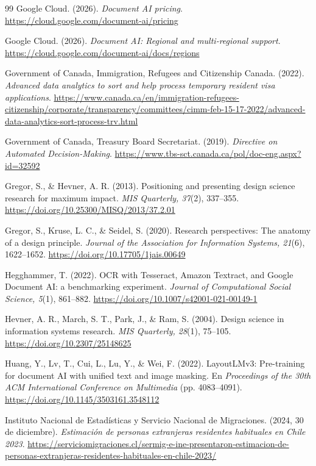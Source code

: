 \documentclass[11pt,a4paper]{article}
\begin{document}
\begin{thebibliography}{99}
Google Cloud. (2026). \emph{Document AI pricing}. \url{https://cloud.google.com/document-ai/pricing}

Google Cloud. (2026). \emph{Document AI: Regional and multi-regional support}. \url{https://cloud.google.com/document-ai/docs/regions}

Government of Canada, Immigration, Refugees and Citizenship Canada. (2022). \emph{Advanced data analytics to sort and help process temporary resident visa applications}. \url{https://www.canada.ca/en/immigration-refugees-citizenship/corporate/transparency/committees/cimm-feb-15-17-2022/advanced-data-analytics-sort-process-trv.html}

Government of Canada, Treasury Board Secretariat. (2019). \emph{Directive on Automated Decision-Making}. \url{https://www.tbs-sct.canada.ca/pol/doc-eng.aspx?id=32592}

Gregor, S., \& Hevner, A. R. (2013). Positioning and presenting design science research for maximum impact. \emph{MIS Quarterly, 37}(2), 337--355. \url{https://doi.org/10.25300/MISQ/2013/37.2.01}

Gregor, S., Kruse, L. C., \& Seidel, S. (2020). Research perspectives: The anatomy of a design principle. \emph{Journal of the Association for Information Systems, 21}(6), 1622--1652. \url{https://doi.org/10.17705/1jais.00649}

Hegghammer, T. (2022). OCR with Tesseract, Amazon Textract, and Google Document AI: a benchmarking experiment. \emph{Journal of Computational Social Science, 5}(1), 861--882. \url{https://doi.org/10.1007/s42001-021-00149-1}

Hevner, A. R., March, S. T., Park, J., \& Ram, S. (2004). Design science in information systems research. \emph{MIS Quarterly, 28}(1), 75--105. \url{https://doi.org/10.2307/25148625}

Huang, Y., Lv, T., Cui, L., Lu, Y., \& Wei, F. (2022). LayoutLMv3: Pre-training for document AI with unified text and image masking. En \emph{Proceedings of the 30th ACM International Conference on Multimedia} (pp. 4083--4091). \url{https://doi.org/10.1145/3503161.3548112}

Instituto Nacional de Estadísticas y Servicio Nacional de Migraciones. (2024, 30 de diciembre). \emph{Estimación de personas extranjeras residentes habituales en Chile 2023}. \url{https://serviciomigraciones.cl/sermig-e-ine-presentaron-estimacion-de-personas-extranjeras-residentes-habituales-en-chile-2023/}


\end{thebibliography}
\end{document}
